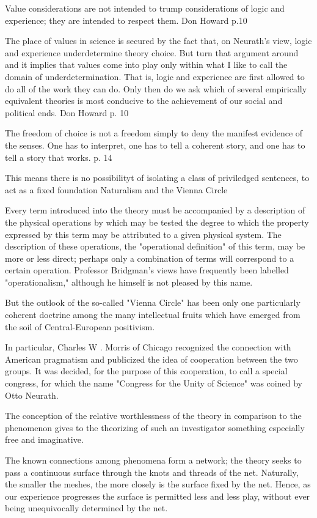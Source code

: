 Value considerations are not intended to trump considerations of logic and experience; they are intended to respect them. Don Howard p.10

The place of values in science is secured by the fact that, on Neurath’s view, logic and experience underdetermine theory choice. But turn that argument around and it implies that values come into play only within what I like to call the domain of underdetermination. That is, logic and experience are first allowed to do all of the work they can do. Only then do we ask which of several empirically equivalent theories is most conducive to the achievement of our social and political ends. Don Howard p. 10

The freedom of choice is not a freedom simply to deny the manifest evidence of the senses. One has to interpret, one has to tell a coherent story, and one has to tell a story that works. p. 14


This means there is no possibilityt of isolating a class of priviledged sentences, to act as a fixed foundation Naturalism and the Vienna Circle

Every term  introduced into the theory must be accompanied by  a description of the physical operations by which may  be tested the degree to which the property expressed  by this term may be attributed to a given physical  system. The description of these operations, the  "operational definition" of this term, may be more or  less direct; perhaps only a combination of terms will  correspond to a certain operation. Professor Bridgman's views have frequently been labelled "operationalism," although he himself is not pleased by this name.

But the outlook of the so-called "Vienna Circle"  has been only one particularly coherent doctrine  among the many intellectual fruits which have  emerged from the soil of Central-European positivism.

In particular, Charles  W . Morris of Chicago recognized the connection  with American pragmatism and publicized the idea  of cooperation between the two groups. It was decided, for the purpose of this cooperation, to call a  special congress, for which the name "Congress for  the Unity of Science" was coined by Otto Neurath.

The conception of the relative worthlessness of the theory in  comparison to the phenomenon gives to the theorizing  of such an investigator something especially free and  imaginative.

The known connections among  phenomena form a network; the theory seeks to pass  a continuous surface through the knots and threads  of the net. Naturally, the smaller the meshes, the  more closely is the surface fixed by the net. Hence,  as our experience progresses the surface is permitted  less and less play, without ever being unequivocally  determined by the net.

